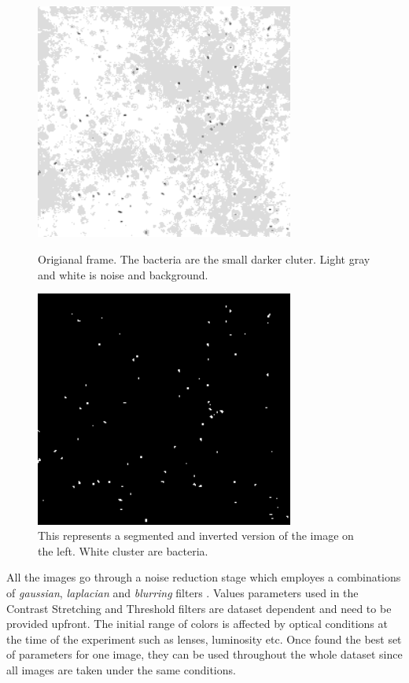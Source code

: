 \documentclass[conference]{IEEEtran}
\begin{document}
\begin{figure}

    \begin{minipage}[l]{1.0\columnwidth}
        \centering
        \includegraphics[width=8.5cm]{./images/bacteriasmall}
        \caption{Origianal frame. The bacteria are the small darker cluter. Light gray and white is noise and background.}\label{fig:contrast}
    \end{minipage}
    \hfill{}
    \begin{minipage}[r]{1.0\columnwidth}
        \centering
        \includegraphics[width=8.5cm]{./images/bacteriasmall_threshold}
        \caption{This represents a segmented and inverted version of the image on the left. White cluster are bacteria.}\label{fig:BBB}
    \end{minipage}
\end{figure}

 
All the images go through a noise reduction stage which employes a combinations of \textit{gaussian}, \textit{laplacian} and \textit{blurring} filters \cite{Deng:1993}.
Values parameters used in the Contrast Stretching and Threshold filters are dataset dependent and need to be provided upfront. The initial range of colors is affected by optical conditions at the time of the experiment such as lenses, luminosity etc. Once found the best set of parameters for one image, they can be used throughout the whole dataset since all images are taken under the same conditions.
\end{document}
